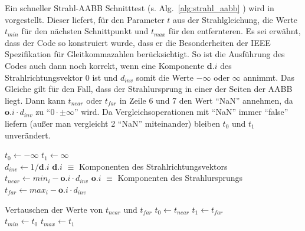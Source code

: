 Ein schneller Strahl-AABB Schnitttest (s. Alg.~\ref{alg:strahl_aabb} ) wird in \cite{pharrhumphrey2010Physically} vorgestellt. Dieser liefert, für den Parameter \( t \) aus der Strahlgleichung, die Werte \( t_{min} \) für den nächsten Schnittpunkt und \( t_{max} \) für den entfernteren. Es sei erwähnt, dass der Code so konstruiert wurde, dass er die Besonderheiten der IEEE Spezifikation für Gleitkommazahlen berücksichtigt. So ist die Ausführung des Codes auch dann noch korrekt, wenn eine Komponente \( {\boldsymbol{d}.i } \) des Strahlrichtungsvektor 0 ist und \( d_{inv} \) somit die Werte \( -\infty \) oder \( \infty \) annimmt. Das Gleiche gilt für den Fall, dass der Strahlursprung in einer der Seiten der AABB liegt. Dann kann \( t_{near} \) oder \( t_{far} \) in Zeile 6 und 7 den Wert "`NaN"' annehmen, da \( {\boldsymbol{o}.i } \cdot d_{inv} \) zu "`\( 0 \cdot \pm\infty  \)"' wird. Da Vergleichsoperationen mit "`NaN"' immer "`false"' liefern (außer man vergleicht 2 "`NaN"' miteinander) bleiben \( t_0 \) und \( t_1 \) unverändert.

\begin{algorithm}[H]
    \caption{Schnittest Strahl-AABB}
    \label{alg:strahl_aabb}
    \begin{algorithmic}[1]
        \State \( t_0 \gets -\infty \)
        \State \( t_1 \gets \infty \)\\
        
            \State \( d_{inv} \gets 1 / {\boldsymbol{d}.i } \)	\Comment \( \boldsymbol{d}.i  \) \( \equiv \) Komponenten des Strahlrichtungsvektors
            \State \( t_{near} \gets min_i - {\boldsymbol{o}.i } \cdot d_{inv}  \)	\Comment \( {\boldsymbol{o}.i } \) \( \equiv \) Komponenten des Strahlursprungs
            \State \( t_{far} \gets max_i - {\boldsymbol{o}.i } \cdot d_{inv} \)
            
                	\Comment Vertauschen der Werte von \( t_{near} \text{ und } t_{far} \)
            \EndIf
                \State \( t_0 \gets t_{near} \)
            \EndIf
            \State \( t_1 \gets t_{far} \)
            \EndIf
                \State{}
            \EndIf
        \EndFor\\
        
        \State \( t_{min} \gets t_0 \)
        \State \( t_{max} \gets t_1 \)
        \State{}
       
    \end{algorithmic}
\end{algorithm}

